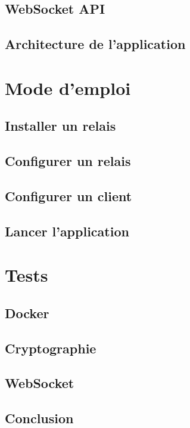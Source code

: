 \documentclass[a4paper,12pt]{report}
\begin{document}
	\subsection{WebSocket API}

	\subsection{Architecture de l'application}

\newpage	
\section{Mode d'emploi}
	\subsection{Installer un relais}
	
	\subsection{Configurer un relais}
	
	\subsection{Configurer un client}

	\subsection{Lancer l'application}
	
\newpage	
\section{Tests}
	\subsection{Docker}
	
	\subsection{Cryptographie}
	
	\subsection{WebSocket}

\newpage	
\begin{center}
\section*{Conclusion}
\end{center}
\end{document}
